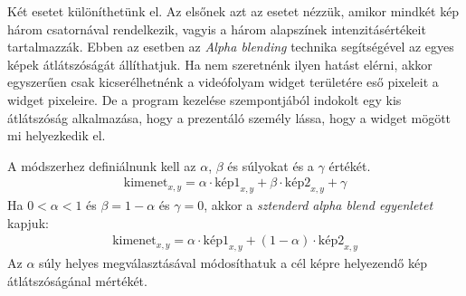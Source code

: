 Két esetet különíthetünk el. Az elsőnek azt az esetet nézzük, amikor mindkét kép három csatornával rendelkezik, vagyis a három alapszínek intenzitásértékeit tartalmazzák. Ebben az esetben az \textit{Alpha blending} technika segítségével az egyes képek átlátszóságát állíthatjuk. Ha nem szeretnénk ilyen hatást elérni, akkor egyszerűen csak kicserélhetnénk a videófolyam widget területére eső pixeleit a widget pixeleire. De a program kezelése szempontjából indokolt egy kis átlátszóság alkalmazása, hogy a prezentáló személy lássa, hogy a widget mögött mi helyezkedik el.

A módszerhez definiálnunk kell az $\alpha$, $\beta$ és súlyokat és a $\gamma$ értékét.
\begin{align*}
	\text{kimenet}_{x,y} = \alpha \cdot \text{kép1}_{x,y} + \beta \cdot \text{kép2}_{x,y} + \gamma
\end{align*}
Ha $0<\alpha<1$ és $\beta = 1 - \alpha$ és $\gamma = 0$, akkor a \textit{sztenderd alpha blend egyenletet}\cite{bradski2008learning} kapjuk:
\begin{align*}
		\text{kimenet}_{x,y} = \alpha \cdot \text{kép1}_{x,y} + (1-\alpha) \cdot \text{kép2}_{x,y}
\end{align*}
Az $\alpha$ súly helyes megválasztásával módosíthatuk a cél képre helyezendő kép átlátszóságánal mértékét.

